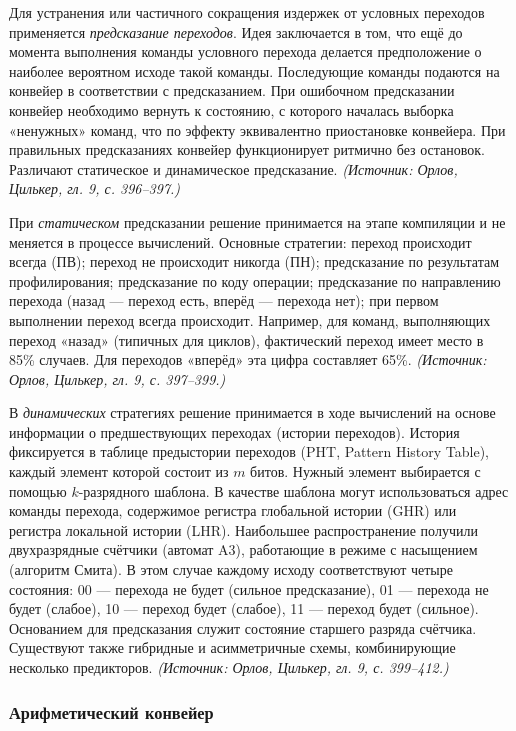 \documentclass[a4paper,12pt]{article}
\begin{document}
Для устранения или частичного сокращения издержек от условных переходов применяется \emph{предсказание переходов}. Идея заключается в том, что ещё до момента выполнения команды условного перехода делается предположение о наиболее вероятном исходе такой команды. Последующие команды подаются на конвейер в соответствии с предсказанием. При ошибочном предсказании конвейер необходимо вернуть к состоянию, с которого началась выборка «ненужных» команд, что по эффекту эквивалентно приостановке конвейера. При правильных предсказаниях конвейер функционирует ритмично без остановок. Различают статическое и динамическое предсказание.
\textit{(Источник: Орлов, Цилькер, гл. 9, с. 396--397.)}

При \emph{статическом} предсказании решение принимается на этапе компиляции и не меняется в процессе вычислений. Основные стратегии: переход происходит всегда (ПВ); переход не происходит никогда (ПН); предсказание по результатам профилирования; предсказание по коду операции; предсказание по направлению перехода (назад --- переход есть, вперёд --- перехода нет); при первом выполнении переход всегда происходит. Например, для команд, выполняющих переход «назад» (типичных для циклов), фактический переход имеет место в 85\% случаев. Для переходов «вперёд» эта цифра составляет 65\%.
\textit{(Источник: Орлов, Цилькер, гл. 9, с. 397--399.)}

В \emph{динамических} стратегиях решение принимается в ходе вычислений на основе информации о предшествующих переходах (истории переходов). История фиксируется в таблице предыстории переходов (PHT, Pattern History Table), каждый элемент которой состоит из \(m\) битов. Нужный элемент выбирается с помощью \(k\)-разрядного шаблона. В качестве шаблона могут использоваться адрес команды перехода, содержимое регистра глобальной истории (GHR) или регистра локальной истории (LHR). Наибольшее распространение получили двухразрядные счётчики (автомат A3), работающие в режиме с насыщением (алгоритм Смита). В этом случае каждому исходу соответствуют четыре состояния: 00 --- перехода не будет (сильное предсказание), 01 --- перехода не будет (слабое), 10 --- переход будет (слабое), 11 --- переход будет (сильное). Основанием для предсказания служит состояние старшего разряда счётчика. Существуют также гибридные и асимметричные схемы, комбинирующие несколько предикторов.
\textit{(Источник: Орлов, Цилькер, гл. 9, с. 399--412.)}

\subsubsection{Арифметический конвейер}
\end{document}
